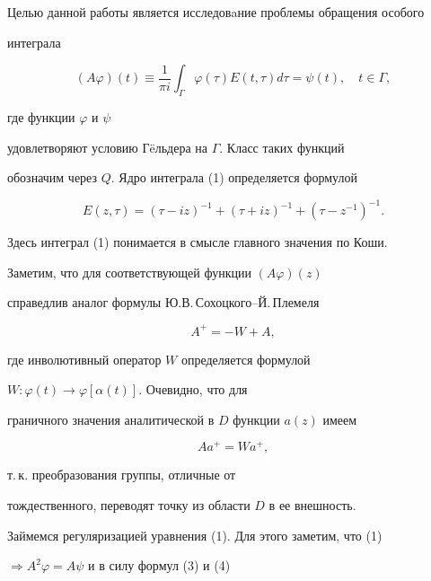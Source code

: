 Целью данной работы является исследовaние проблемы обращения особого


интеграла


\begin{equation}


(A\varphi)(t)\equiv\frac{1}{\pi


i}\int_{\Gamma}\varphi(\tau)E(t,\tau)d\tau =\psi(t),\quad


t\in\Gamma,


\end{equation}


где функции $\varphi$ и $\psi$


удовлетворяют условию Г\"eльдера на $\Gamma$. Класс таких функций


обозначим через $Q$. Ядро интеграла (1) определяется формулой


\begin{equation}


E(z,\tau)=(\tau-iz)^{-1}+(\tau+iz)^{-1}+(\tau-z^{-1})^{-1}.


\end{equation}


Здесь интеграл (1) понимается в смысле главного значения по Коши.


Заметим, что для соответствующей функции $(A\varphi)(z)$


справедлив аналог формулы Ю.В.\,Сохоцкого--Й.\,Племеля


\begin{equation}


A^{+}=-W+A,


\end{equation}


где инволютивный оператор $W$ определяется формулой


$W:\varphi(t)\to\varphi[\alpha(t)]$. Очевидно, что для


граничного значения аналитической в $D$ функции $a(z)$ имеем


\begin{equation}


Aa^{+}=Wa^{+},


\end{equation}


т.\,к. преобразования группы, отличные от


тождественного, переводят точку из области $D$ в ее внешность.


Займемся регуляризацией уравнения (1). Для этого заметим, что (1)


$\Longrightarrow A^{2}\varphi=A\psi$ и в силу формул (3) и (4)



